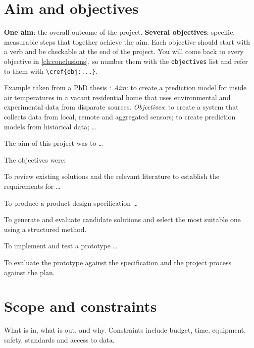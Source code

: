 \section{Aim and objectives}
\label{sec:objectives}

\begin{guidance}
\textbf{One aim}: the overall outcome of the project.
\textbf{Several objectives}: specific, measurable steps that together achieve
the aim. Each objective should start with a verb and be checkable at the end
of the project. You will come back to every objective in
\cref{ch:conclusions}, so number them with the \texttt{objectives} list and
refer to them with \verb|\cref{obj:...}|.

Example taken from a PhD thesis \parencite{bausch2014}:
\emph{Aim}: to create a prediction model for inside air temperatures in a
vacant residential home that uses environmental and experimental data from
disparate sources. \emph{Objectives}: to create a system that collects data
from local, remote and aggregated sensors; to create prediction models from
historical data; \ldots
\end{guidance}

The aim of this project was to \ldots

The objectives were:
\begin{objectives}
  \item\label{obj:review} To review existing solutions and the relevant
    literature to establish the requirements for \ldots
  \item\label{obj:spec} To produce a product design specification \ldots
  \item\label{obj:design} To generate and evaluate candidate solutions and
    select the most suitable one using a structured method.
  \item\label{obj:build} To implement and test a prototype \ldots
  \item\label{obj:evaluate} To evaluate the prototype against the
    specification and the project process against the plan.
\end{objectives}

\section{Scope and constraints}
\label{sec:scope}

\begin{guidance}
What is in, what is out, and why. Constraints include budget, time,
equipment, safety, standards and access to data.
\end{guidance}

